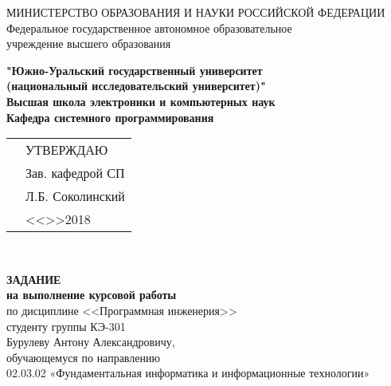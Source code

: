 
\begin{article}
\begin{center}

\large{
МИНИСТЕРСТВО ОБРАЗОВАНИЯ И НАУКИ РОССИЙСКОЙ ФЕДЕРАЦИИ}
\Large{Федеральное государственное автономное образовательное \\ 
учреждение высшего образования}

\Large{\textbf{
"Южно-Уральский государственный университет \\ 
(национальный исследовательский университет)" \\ 
Высшая школа электроники и компьютерных наук \\ 
Кафедра системного программирования}}\\

\vspace{0.5cm}

\begin{tabular}{ll}
\hspace{9cm} & УТВЕРЖДАЮ \\
& Зав. кафедрой СП \\
& \underline{\hspace{3cm}}Л.Б. Соколинский \\
& <<\underline{\hspace{0.5cm}}>>\underline{\hspace{3cm}}2018
\end{tabular}\

\vspace{1cm}

\Large{\textbf{
ЗАДАНИЕ \\ 
на выполнение курсовой работы} \\
по дисциплине <<Программная инженерия>> \\
студенту группы КЭ-301 \\
Бурулеву Антону Александровичу, \\
обучающемуся по направлению \\
02.03.02 «Фундаментальная информатика и информационные технологии» \\
}

\vspace{0.5cm}


\end{center}


\end{article}
